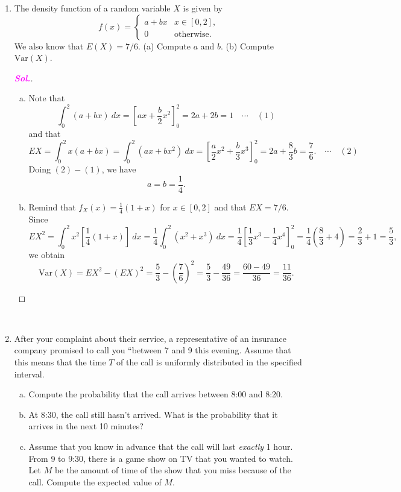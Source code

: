 \documentclass[12pt,a4paper]{article}
\theoremstyle{definition}
\theoremstyle{definition}
\theoremstyle{definition}
\theoremstyle{definition}
\theoremstyle{remark}
\theoremstyle{definition}
\newcommand{\dispsty}{\displaystyle}
\newcommand{\sol}{\textcolor{magenta}{\bf \textit{Sol.}}\quad}
\newcommand{\Var}{\text{Var}}
\begin{document}
\begin{enumerate}[\bf 1.]
\begin{proof}[\sol]
\begin{enumerate}[(a)]
\[\begin{cases}
			0 & \text{otherwise}.
			\end{cases}
			\]
		\end{enumerate}
	\end{proof}\
	\item The density function of a random variable $X$ is given by \[
	f(x)=\begin{cases}
	a+bx & x\in[0,2],\\
	0 &\text{otherwise}.
	\end{cases}
	\] We also know that $E(X)=7/6$. (a) Compute $a$ and $b$. (b) Compute $\Var(X)$.\\ \begin{proof}[\sol]
		\begin{enumerate}[(a)]
			\item Note that \[
			\int_0^2(a+bx)\ dx=\left[ax+\frac{b}{2}x^2\right]_0^2=2a+2b=1\quad\cdots\quad(1)
			\] and that \[
			EX=\int_0^2x(a+bx)=\int_0^2(ax+bx^2)\ dx=\left[\frac{a}{2}x^2+\frac{b}{3}x^3\right]_0^2=2a+\frac{8}{3}b=\frac{7}{6}. \quad\cdots\quad(2)
			\] Doing $(2)-(1)$, we have \[
			a=b=\frac{1}{4}.
			\]
			\item Remind that $f_X(x)=\dispsty\frac{1}{4}\left(1+x\right)$ for $x\in[0,2]$ and that $EX=7/6$. Since \[
			EX^2=\int_0^2 x^2\left[\frac{1}{4}(1+x)\right]\ dx=\frac{1}{4}\int_0^2(x^2+x^3)\ dx=\frac{1}{4}\left[\frac{1}{3}x^3-\frac{1}{4}x^4\right]_0^2=\frac{1}{4}\left(\frac{8}{3}+4\right)=\frac{2}{3}+1=\frac{5}{3},
			\] we obtain \[
			\Var(X)=EX^2-(EX)^2=\frac{5}{3}-\left(\frac{7}{6}\right)^2=\frac{5}{3}-\frac{49}{36}=\frac{60-49}{36}=\frac{11}{36}.
			\]
		\end{enumerate}
	\end{proof}\
	\item After your complaint about their service, a representative of an insurance company promised to call you ``between 7 and 9 this evening. Assume that this means that the time $T$ of the call is uniformly distributed in the specified interval. \begin{enumerate}[(a)]
		\item Compute the probability that the call arrives between 8:00 and 8:20.
		\item At 8:30, the call still hasn't arrived. What is the probability that it arrives in the next 10 minutes?
		\item Assume that you know in advance that the call will last \textit{exactly} 1 hour. From 9 to 9:30, there is a game show on TV that you wanted to watch. Let $M$ be the amount of time of the show that you miss because of the call. Compute the expected value of $M$.

\end{enumerate}
\end{enumerate}
\end{document}
